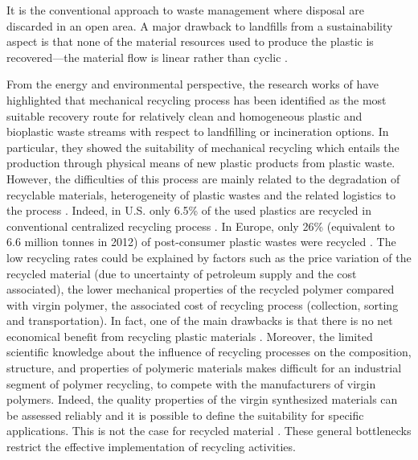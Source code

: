\begin{description}[labelindent=0.5cm, noitemsep]
\item[Landfilling:] It is the conventional approach to waste management where disposal are discarded in an open area.
A major drawback to landfills from a sustainability aspect is that none of the material resources used to produce the plastic is recovered—the material flow is linear rather than cyclic \parencite{Hopewell2009}.

\end{description}


From the energy and environmental perspective, the research works of \textcite{Arena2003,Perugini2005,Piemonte2011} have highlighted that mechanical recycling process has been identified as the most suitable  recovery route for relatively clean and homogeneous plastic and bioplastic waste streams with respect to landfilling or incineration options.  
In particular, they showed the suitability of mechanical recycling which entails the production through physical means of new plastic products from plastic waste. 
However, the  difficulties of this process are mainly related to the degradation of recyclable materials,  heterogeneity of plastic wastes and the related  logistics  to the process \parencite{Al-Salem2009}.
Indeed, in U.S. only 6.5\% of the used plastics are recycled in conventional centralized recycling process \parencite{Themelis2011}. 
In Europe, only 26\% (equivalent to 6.6 million tonnes in 2012) of post-consumer plastic wastes were recycled \parencite{Plastics2014, Plastics2016}.  
The low recycling rates could be explained by factors such as the price variation of the recycled material (due to uncertainty of petroleum supply and the cost associated),  the lower mechanical properties of the recycled polymer compared with virgin polymer, the associated  cost of recycling process (collection, sorting  and transportation).
In fact, one of the main drawbacks  is that there is no net economical benefit from recycling plastic materials  \parencite{Craighill1996}.  
Moreover, the limited scientific knowledge about the influence of recycling processes on the composition, structure, and properties of polymeric materials makes difficult for an industrial segment of polymer recycling, to compete with the manufacturers of virgin polymers.
Indeed,  the quality properties of the virgin synthesized materials can be assessed reliably  and it is possible to define the suitability for specific applications. This is not the case for recycled material  \parencite{Hopewell2009, Vilaplana2008}.
These general bottlenecks restrict the effective implementation of recycling activities.


